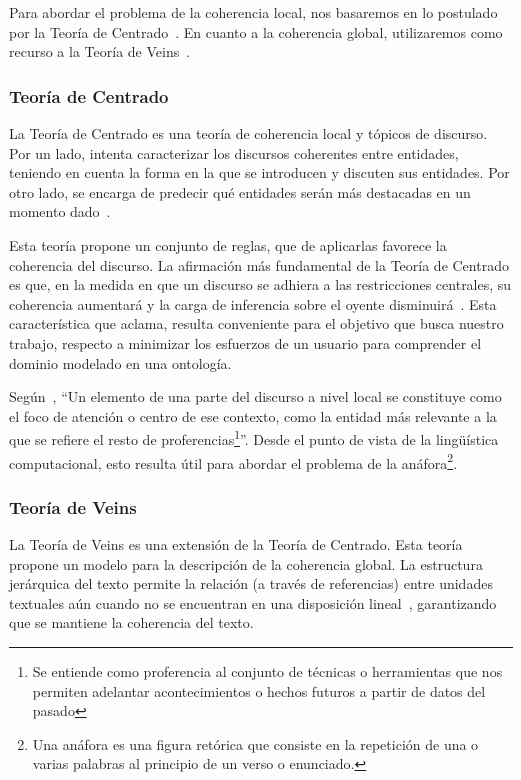 Para abordar el problema de la coherencia local, nos basaremos en lo postulado por la Teoría de Centrado~\cite{grosz1986towards}.
En cuanto a la coherencia global, utilizaremos como recurso a la Teoría de Veins~\cite{cristea1998veins}.

\subsubsection{Teoría de Centrado}
La Teoría de Centrado es una teoría de coherencia local y tópicos de discurso. Por un lado, intenta caracterizar los discursos coherentes entre entidades, teniendo en cuenta la forma en la que se introducen y discuten sus entidades. Por otro lado, se encarga de predecir qué entidades serán más destacadas en un momento dado~\cite{poesio2004centering}.

Esta teoría propone un conjunto de reglas, que de aplicarlas favorece la coherencia del discurso. La afirmación más fundamental de la Teoría de Centrado es que, en la medida en que un discurso se adhiera a las restricciones centrales, su coherencia aumentará y la carga de inferencia sobre el oyente disminuirá~\cite{kruijff1997topics}. Esta característica que aclama, resulta conveniente para el objetivo que busca nuestro trabajo, respecto a minimizar los esfuerzos de un usuario para comprender el dominio modelado en una ontología.

Según~\cite{vicente2015generacion}, ``Un elemento de una parte del discurso a nivel local se constituye como el foco de atención o centro de ese contexto, como la entidad más relevante a la que se refiere el resto de proferencias\footnote{Se entiende como proferencia al conjunto de técnicas o herramientas que nos permiten adelantar acontecimientos o hechos futuros a partir de datos del pasado}''. Desde el punto de vista de la lingüística computacional, esto resulta útil para abordar el problema de la anáfora\footnote{Una anáfora es una figura retórica que consiste en la repetición de una o varias palabras al principio de un verso o enunciado.}. 

\subsubsection{Teoría de Veins}
La Teoría de Veins es una extensión de la Teoría de Centrado. Esta teoría propone un modelo para la descripción de la coherencia global. La estructura jerárquica del texto permite la relación (a través de referencias) entre unidades textuales aún cuando no se encuentran en una disposición lineal~\cite{cristea2005motivations}, garantizando que se mantiene la coherencia del texto.

